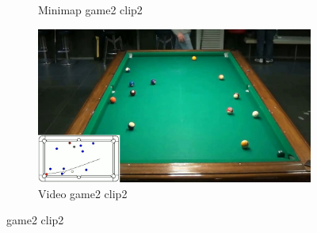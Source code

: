 \begin{figure}[H]
\begin{subfigure}[b]{0.48\textwidth}
    	\caption{Minimap game2 clip2}
    	\label{fig: game2_clip2_minimap}
    \end{subfigure}
    \begin{subfigure}[b]{0.48\textwidth}
    	\centering
    	\includegraphics[width=\textwidth]{images/Video/game2_clip2_video.jpg}
    	\caption{Video game2 clip2}
    	\label{fig: game2_clip2_video}
    \end{subfigure}
    
	\caption{game2 clip2}
\end{figure}

